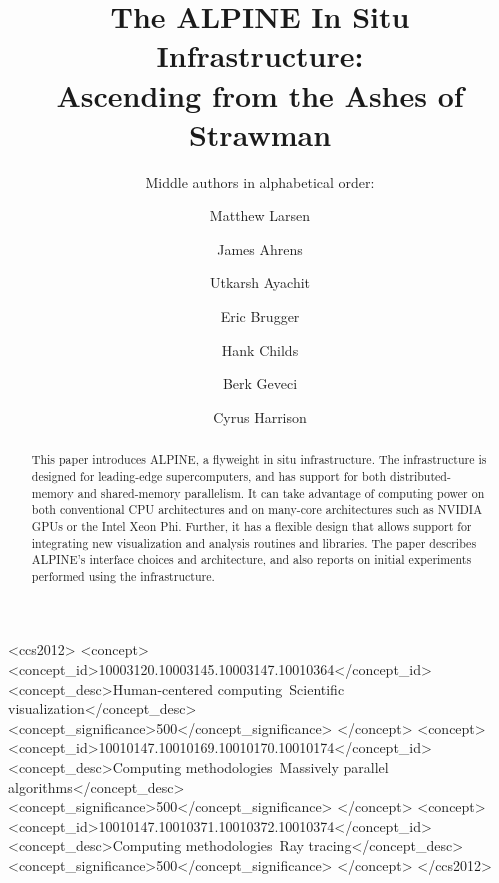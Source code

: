 \documentclass[sigconf]{acmart}
\begin{document}
\title{The ALPINE In Situ Infrastructure: \\ Ascending from the Ashes of Strawman}
\subtitle{Middle authors in alphabetical order:}

\author{Matthew Larsen}

\author{James Ahrens}

\author{Utkarsh Ayachit}

\author{Eric Brugger}

\author{Hank Childs}

\author{Berk Geveci}

\author{Cyrus Harrison}



\renewcommand{\shortauthors}{Humans et al.}



\begin{abstract}
This paper introduces ALPINE, a flyweight in situ infrastructure.
%
The infrastructure is designed for leading-edge supercomputers, and
has support for both distributed-memory and shared-memory parallelism.
%
It can take advantage of computing power on both conventional CPU architectures
and on many-core architectures such as NVIDIA GPUs or the Intel Xeon Phi.
%
Further, it has a flexible design that allows support for integrating new
visualization and analysis routines and libraries.
%
The paper describes ALPINE's interface choices and architecture, and also reports
on initial experiments performed using the infrastructure.
\end{abstract}

%
%
\begin{CCSXML}
<ccs2012>
<concept>
<concept_id>10003120.10003145.10003147.10010364</concept_id>
<concept_desc>Human-centered computing~Scientific visualization</concept_desc>
<concept_significance>500</concept_significance>
</concept>
<concept>
<concept_id>10010147.10010169.10010170.10010174</concept_id>
<concept_desc>Computing methodologies~Massively parallel algorithms</concept_desc>
<concept_significance>500</concept_significance>
</concept>
<concept>
<concept_id>10010147.10010371.10010372.10010374</concept_id>
<concept_desc>Computing methodologies~Ray tracing</concept_desc>
<concept_significance>500</concept_significance>
</concept>
</ccs2012>
\end{CCSXML}
\end{document}
